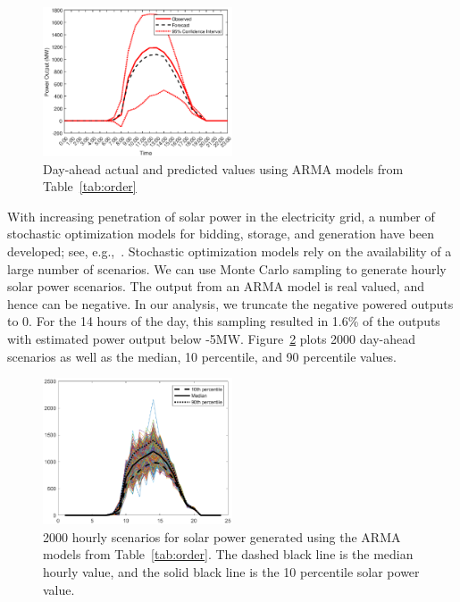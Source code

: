\documentclass[letter]{IEEEtran}
\begin{document}
\begin{figure}[!t]
	\centering
	\includegraphics[width=0.5\textwidth]{prediction.eps}
	\caption{Day-ahead actual and predicted values using ARMA models from 
		Table~\ref{tab:order}}
	\label{fig:prediction}
\end{figure}

With increasing penetration of solar power in the electricity grid, a number of 
stochastic optimization models for bidding, storage, and generation have been 
developed; see, e.g.,~\cite{banos2011optimization}. 
Stochastic optimization models rely on the availability of a large number of 
scenarios.  We can use Monte Carlo sampling to generate hourly solar power 
scenarios. The output from an ARMA model is real valued, and hence can be 
negative. In our analysis, we truncate the negative powered outputs to 0. For 
the 14 hours of 
the day, this sampling resulted in 1.6\% of the outputs with estimated power 
output below -5MW. Figure~\ref{fig:sample} plots 2000 day-ahead scenarios 
as well as the median, 10 percentile, and 90 percentile values. 


\begin{figure}[!t]
	\centering
	\includegraphics[width=0.5\textwidth]{sample_smooth.eps}
	\caption{2000 hourly scenarios for solar power generated using the ARMA models 
		from Table~\ref{tab:order}. The dashed black line is the median hourly value, 
		and the solid black line is
		the 10 percentile solar power value.}
	\label{fig:sample}
\end{figure}
\end{document}
